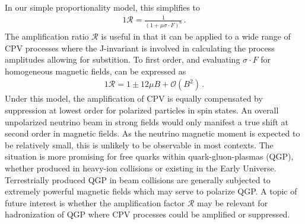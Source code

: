 In our simple proportionality model, this simplifies to
\begin{alignat}{1}
	\label{amp:2} \mathcal{R} = \frac{1}{\left(1+\mu\sigma\cdot F\right)^{6}}\,.
\end{alignat}
The amplification ratio $\mathcal{R}$ is useful in that it can be applied to a wide range of CPV processes where the J-invariant is involved in calculating the process amplitudes allowing for substition. To first order, and evaluating $\sigma\cdot F$ for homogeneous magnetic fields,  can be expressed as
\begin{alignat}{1}
	\label{amp:3} \mathcal{R} = 1\pm12\mu B+\mathcal{O}(B^{2})\,.
\end{alignat}
Under this model, the amplification of CPV is equally compensated by suppression at lowest order for polarized particles in spin states. An overall unpolarized neutrino beam in strong fields would only manifest a true shift at second order in magnetic fields. As the neutrino magnetic moment is expected to be relatively small, this is unlikely to be observable in most contexts. The situation is more promising for free quarks within quark-gluon-plasmas (QGP), whether produced in heavy-ion collisions or existing in the Early Universe. Terrestrially produced QGP in beam collisions are generally subjected to extremely powerful magnetic fields which may serve to polarize QGP. \ar A topic of future interest is whether the amplification factor $\mathcal{R}$ may be relevant for hadronization of QGP where CPV processes could be amplified or suppressed.
